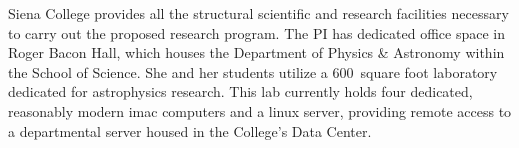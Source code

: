 \documentclass[11pt,preprint]{aastex}
\begin{document}
Siena College provides all the structural scientific and research facilities
necessary to carry out the proposed research program.  The PI has dedicated
office space in Roger Bacon Hall, which houses the Department of Physics \&
Astronomy within the School of Science.  She and her students utilize a
$600$~square foot laboratory dedicated for astrophysics research.  This lab
currently holds four dedicated, reasonably modern imac computers and a
linux server, providing remote access to a departmental server housed in the College's
Data Center.  
\end{document}
